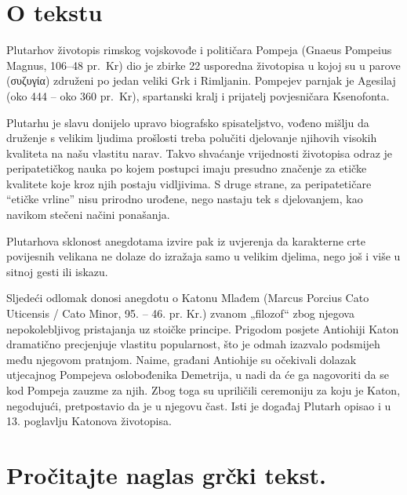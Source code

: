 


\section*{O tekstu}

Plutarhov životopis rimskog vojskovođe i političara Pompeja (Gnaeus Pompeius Magnus, 106–48 pr.~Kr) dio je zbirke 22 usporedna životopisa u kojoj su u parove \textgreek[variant=ancient]{(συζυγία)} združeni po jedan veliki Grk i Rimljanin. Pompejev parnjak je Agesilaj (oko 444 – oko 360 pr.~Kr), spartanski kralj i prijatelj povjesničara Ksenofonta. 

Plutarhu je slavu donijelo upravo biografsko spisateljstvo, vođeno mišlju da druženje s velikim ljudima prošlosti treba polučiti djelovanje njihovih visokih kvaliteta na našu vlastitu narav. Takvo shvaćanje vrijednosti životopisa odraz je peripatetičkog nauka po kojem postupci imaju presudno značenje za etičke kvalitete koje kroz njih postaju vidljivima. S druge strane, za peripatetičare ``etičke vrline'' nisu prirodno urođene, nego nastaju tek s djelovanjem, kao navikom stečeni načini ponašanja. 

Plutarhova sklonost anegdotama izvire pak iz uvjerenja da karakterne crte povijesnih velikana ne dolaze do izražaja samo u velikim djelima, nego još i više u sitnoj gesti ili iskazu. 

Sljedeći odlomak donosi anegdotu o Katonu Mlađem (Marcus Porcius Cato Uticensis / Cato Minor, 95. – 46. pr. Kr.) zvanom „filozof“ zbog njegova nepokolebljivog pristajanja uz stoičke principe. Prigodom posjete Antiohiji Katon dramatično precjenjuje vlastitu popularnost, što je odmah izazvalo podsmijeh među njegovom pratnjom. Naime, građani Antiohije su očekivali dolazak utjecajnog Pompejeva oslobođenika Demetrija, u nadi da će ga nagovoriti da se kod Pompeja zauzme za njih. Zbog toga su upriličili ceremoniju za koju je Katon, negodujući, pretpostavio da je u njegovu čast. Isti je događaj Plutarh opisao i u 13. poglavlju Katonova životopisa.


\section*{Pročitajte naglas grčki tekst.}

